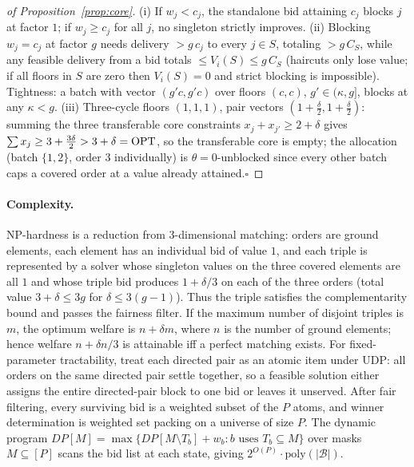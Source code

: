 \begin{proof}[of Proposition~\ref{prop:core}]
(i) If $w_j<c_j$, the standalone bid attaining $c_j$ blocks $j$ at factor
$1$; if $w_j\ge c_j$ for all $j$, no singleton strictly improves. (ii)
Blocking $w_j=c_j$ at factor $g$ needs delivery $>g\,c_j$ to every
$j\in S$, totaling $>g\,C_S$, while any feasible delivery from a bid
totals $\le V_i(S)\le g\,C_S$ (haircuts only lose value; if all floors in
$S$ are zero then $V_i(S)=0$ and strict blocking is impossible).
Tightness: a batch with vector $(g'c,g'c)$ over floors $(c,c)$,
$g'\in(\kappa,g]$, blocks at any $\kappa<g$. (iii) Three-cycle floors
$(1,1,1)$, pair vectors $(1+\tfrac\delta2,1+\tfrac\delta2)$: summing the
three transferable core constraints $x_j+x_{j'}\ge2+\delta$ gives
$\sum x_j\ge3+\tfrac{3\delta}2>3+\delta=\mathrm{OPT}$, so the transferable core is
empty; the allocation (batch $\{1,2\}$, order $3$ individually) is
$\theta=0$-unblocked since every other batch caps a covered order at a
value already attained.\hfill$\square$
\end{proof}

\paragraph{Complexity.}
NP-hardness is a reduction from 3-dimensional matching: orders are ground
elements, each element has an individual bid of value $1$, and each triple
is represented by a solver whose singleton values on the three covered
elements are all $1$ and whose triple bid produces $1+\delta/3$ on each of
the three orders (total value $3+\delta\le3g$ for $\delta\le3(g-1)$). Thus
the triple satisfies the complementarity bound and passes the fairness
filter.
If the maximum number of disjoint triples is $m$, the optimum welfare is
$n+\delta m$, where $n$ is the number of ground elements; hence welfare
$n+\delta n/3$ is attainable iff a perfect matching exists. For
fixed-parameter tractability, treat each directed pair as an atomic item
under UDP: all orders on the same directed pair settle together, so a
feasible solution either assigns the entire directed-pair block to one
bid or leaves it unserved. After fair filtering, every surviving bid is a
weighted subset of the $P$ atoms, and winner determination is weighted set
packing on a universe of size $P$. The dynamic program
$DP[M]=\max\{DP[M\setminus T_b]+w_b:b\text{ uses }T_b\subseteq M\}$
over masks $M\subseteq[P]$ scans the bid list at each state, giving
$2^{O(P)}\cdot\mathrm{poly}(|\mathcal B|)$.


